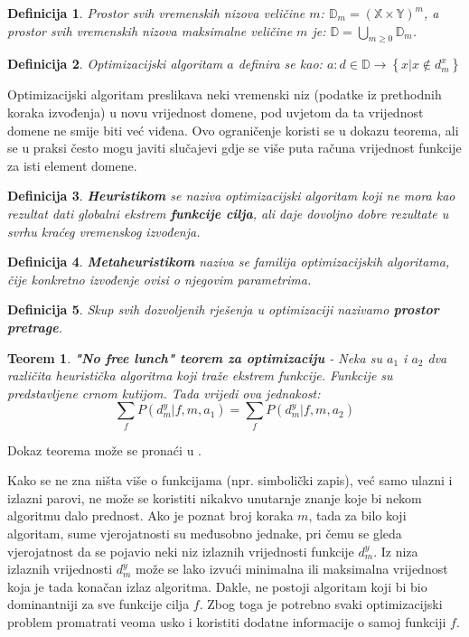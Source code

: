 \documentclass[times, utf8, diplomski, numeric]{fer}
\newtheorem{definition}{Definicija}
\newtheorem{theorem}{Teorem}
\begin{document}
\begin{definition}
Prostor svih vremenskih nizova veličine $m$: $\mathbb{D}_m = (\mathbb{X} \times \mathbb{Y})^m$, a prostor svih vremenskih nizova maksimalne veličine $m$ je: $\mathbb{D} = \bigcup_{m\ge0}\mathbb{D}_m$.
\end{definition}

\begin{definition}
Optimizacijski algoritam $a$ definira se kao: $a : d \in \mathbb{D} \rightarrow \left \{x | x \notin d_m^x \right \}$
\end{definition}

Optimizacijski algoritam preslikava neki vremenski niz (podatke iz prethodnih koraka izvođenja) u novu vrijednost domene, pod uvjetom da ta vrijednost domene ne smije biti već viđena. Ovo ograničenje koristi se u dokazu teorema, ali se u praksi često mogu javiti slučajevi gdje se više puta računa vrijednost funkcije za isti element domene.

\begin{definition}
\textbf{Heuristikom} se naziva optimizacijski algoritam koji ne mora kao rezultat dati globalni ekstrem \textbf{funkcije cilja}, ali daje dovoljno dobre rezultate u svrhu kraćeg vremenskog izvođenja. 
\end{definition}

\begin{definition}
\textbf{Metaheuristikom} naziva se familija optimizacijskih algoritama, čije konkretno izvođenje ovisi o njegovim parametrima.
\end{definition}

\begin{definition}
Skup svih dozvoljenih rješenja u optimizaciji nazivamo \textbf{prostor pretrage}.
\end{definition}

\begin{theorem}
\label{thm:nofreelunch}
\textbf{"No free lunch" teorem za optimizaciju} - Neka su $a_1$ i $a_2$ dva različita heuristička algoritma koji traže ekstrem funkcije. Funkcije su predstavljene crnom kutijom. Tada vrijedi ova jednakost:
\begin{equation}
	\sum_{f}P(d_m^y|f,m,a_1) = \sum_{f}P(d_m^y|f,m,a_2)
\end{equation}
\end{theorem}

Dokaz teorema može se pronaći u \cite{lit15}.

Kako se ne zna ništa više o funkcijama (npr. simbolički zapis), već samo ulazni i izlazni parovi, ne može se koristiti nikakvo unutarnje znanje koje bi nekom algoritmu dalo prednost. Ako je poznat broj koraka $m$, tada za bilo koji algoritam, sume vjerojatnosti su međusobno jednake, pri čemu se gleda vjerojatnost da se pojavio neki niz izlaznih vrijednosti funkcije $d_m^y$.
Iz niza izlaznih vrijednosti $d_m^y$ može se lako izvući minimalna ili maksimalna vrijednost koja je tada konačan izlaz algoritma. Dakle, ne postoji algoritam koji bi bio dominantniji za sve funkcije cilja $f$. Zbog toga je potrebno svaki optimizacijski problem promatrati veoma usko i koristiti dodatne informacije o samoj funkciji $f$.
\end{document}
